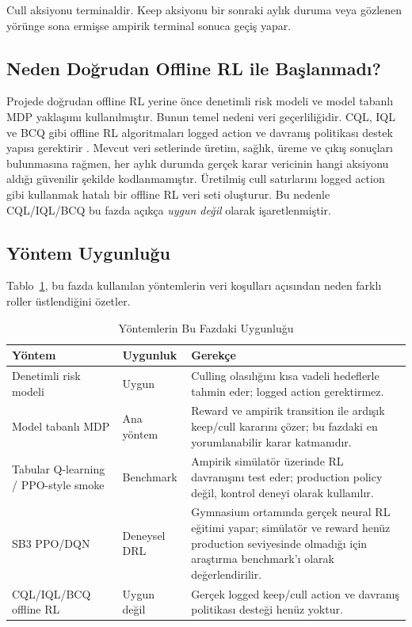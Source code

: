 \documentclass[conference]{IEEEtran}
\begin{document}
Cull aksiyonu terminaldir. Keep aksiyonu bir sonraki aylık duruma veya gözlenen
yörünge sona ermişse ampirik terminal sonuca geçiş yapar.

\subsection{Neden Doğrudan Offline RL ile Başlanmadı?}
Projede doğrudan offline RL yerine önce denetimli risk modeli ve model tabanlı
MDP yaklaşımı kullanılmıştır. Bunun temel nedeni veri geçerliliğidir. CQL, IQL
ve BCQ gibi offline RL algoritmaları logged action ve davranış politikası destek
yapısı gerektirir \cite{kumar2020cql,kostrikov2021iql,fujimoto2019bcq}. Mevcut
veri setlerinde üretim, sağlık, üreme ve çıkış sonuçları bulunmasına rağmen,
her aylık durumda gerçek karar vericinin hangi aksiyonu aldığı güvenilir şekilde
kodlanmamıştır. Üretilmiş cull satırlarını logged action gibi kullanmak hatalı
bir offline RL veri seti oluşturur. Bu nedenle CQL/IQL/BCQ bu fazda açıkça
\emph{uygun değil} olarak işaretlenmiştir.

\subsection{Yöntem Uygunluğu}
Tablo~\ref{tab:method_suitability}, bu fazda kullanılan yöntemlerin veri
koşulları açısından neden farklı roller üstlendiğini özetler.

\begin{table}[!t]
\caption{Yöntemlerin Bu Fazdaki Uygunluğu}
\label{tab:method_suitability}
\centering
\begin{tabular}{p{}p{}p{}}
\toprule
Yöntem & Uygunluk & Gerekçe \\
\midrule
Denetimli risk modeli & Uygun & Culling olasılığını kısa vadeli hedeflerle
tahmin eder; logged action gerektirmez. \\
Model tabanlı MDP & Ana yöntem & Reward ve ampirik transition ile ardışık
keep/cull kararını çözer; bu fazdaki en yorumlanabilir karar katmanıdır. \\
Tabular Q-learning / PPO-style smoke & Benchmark & Ampirik simülatör üzerinde
RL davranışını test eder; production policy değil, kontrol deneyi olarak
kullanılır. \\
SB3 PPO/DQN & Deneysel DRL & Gymnasium ortamında gerçek neural RL eğitimi
yapar; simülatör ve reward henüz production seviyesinde olmadığı için araştırma
benchmark'ı olarak değerlendirilir. \\
CQL/IQL/BCQ offline RL & Uygun değil & Gerçek logged keep/cull action ve
davranış politikası desteği henüz yoktur. \\
\bottomrule
\end{tabular}
\end{table}
\end{document}
